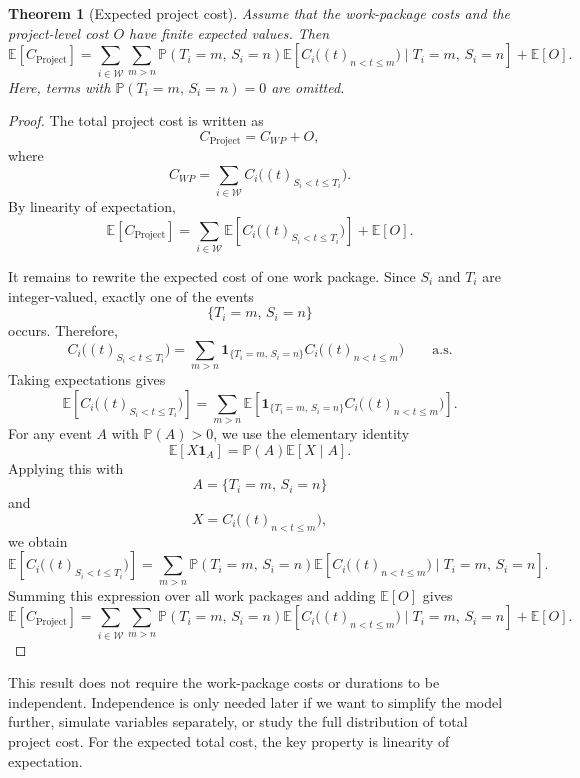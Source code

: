 \documentclass[11pt,a4paper]{article}
\providecommand{\E}{\mathbb{E}}
\newcommand{\cW}{\mathcal{W}}
\newcommand{\pP}{\mathbb{P}}
\newcommand{\E}{\mathbb{E}}
\newcommand{\1}{\mathbf{1}}
\theoremstyle{definition}
\theoremstyle{plain}
\newtheorem{theorem}{Theorem}[section]
\theoremstyle{remark}
\numberwithin{equation}{section}
\begin{document}
\begin{theorem}[Expected project cost]
Assume that the work-package costs and the project-level cost $O$ have finite expected values. Then
\[
\E[C_{\text{Project}}]
=
\sum_{i\in\cW}
\sum_{m>n}
\pP(T_i=m,\,S_i=n)
\E\left[
C_i\bigl((t)_{n<t\leq m}\bigr)
\mid
T_i=m,\,S_i=n
\right]
+
\E[O].
\]
Here, terms with $\pP(T_i=m,\,S_i=n)=0$ are omitted.
\end{theorem}

\begin{proof}
The total project cost is written as
\[
C_{\text{Project}}
=
C_{WP}+O,
\]
where
\[
C_{WP}
=
\sum_{i\in\cW}
C_i\bigl((t)_{S_i<t\leq T_i}\bigr).
\]
By linearity of expectation,
\[
\E[C_{\text{Project}}]
=
\sum_{i\in\cW}
\E\left[
C_i\bigl((t)_{S_i<t\leq T_i}\bigr)
\right]
+
\E[O].
\]

It remains to rewrite the expected cost of one work package. Since $S_i$ and $T_i$ are integer-valued, exactly one of the events
\[
\{T_i=m,\,S_i=n\}
\]
occurs. Therefore,
\[
C_i\bigl((t)_{S_i<t\leq T_i}\bigr)
=
\sum_{m>n}
\1_{\{T_i=m,\,S_i=n\}}
C_i\bigl((t)_{n<t\leq m}\bigr)
\qquad \text{a.s.}
\]
Taking expectations gives
\[
\E\left[
C_i\bigl((t)_{S_i<t\leq T_i}\bigr)
\right]
=
\sum_{m>n}
\E\left[
\1_{\{T_i=m,\,S_i=n\}}
C_i\bigl((t)_{n<t\leq m}\bigr)
\right].
\]
For any event $A$ with $\pP(A)>0$, we use the elementary identity
\[
\E[X\1_A]
=
\pP(A)\E[X\mid A].
\]
Applying this with
\[
A=\{T_i=m,\,S_i=n\}
\]
and
\[
X=C_i\bigl((t)_{n<t\leq m}\bigr),
\]
we obtain
\[
\E\left[
C_i\bigl((t)_{S_i<t\leq T_i}\bigr)
\right]
=
\sum_{m>n}
\pP(T_i=m,\,S_i=n)
\E\left[
C_i\bigl((t)_{n<t\leq m}\bigr)
\mid
T_i=m,\,S_i=n
\right].
\]
Summing this expression over all work packages and adding $\E[O]$ gives
\[
\E[C_{\text{Project}}]
=
\sum_{i\in\cW}
\sum_{m>n}
\pP(T_i=m,\,S_i=n)
\E\left[
C_i\bigl((t)_{n<t\leq m}\bigr)
\mid
T_i=m,\,S_i=n
\right]
+
\E[O].
\]
\end{proof}

This result does not require the work-package costs or durations to be independent. Independence is only needed later if we want to simplify the model further, simulate variables separately, or study the full distribution of total project cost. For the expected total cost, the key property is linearity of expectation.


\newpage
\end{document}
